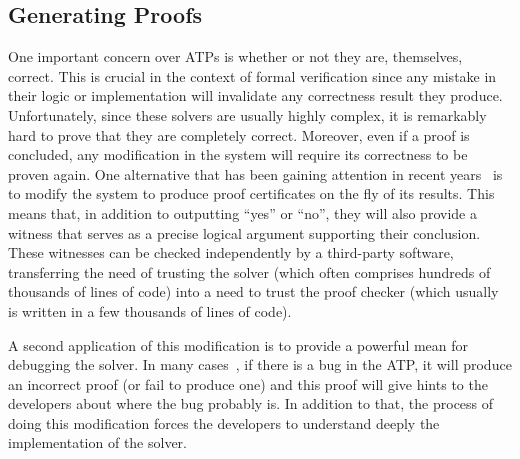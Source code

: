 \documentclass[a4paper, 12pt]{article}
\begin{document}
\subsection{Generating Proofs}
One important concern over ATPs is whether or not they are, themselves, correct. This is crucial
in the context of formal verification since any mistake in their logic or implementation will invalidate any
correctness result they produce. Unfortunately, since these solvers are usually highly complex,
it is remarkably hard to prove that they are completely correct. Moreover, even if a proof is concluded,
any modification in the system will require its correctness to be proven again. One alternative that has been
gaining attention in recent years~\cite{generatingProofs, proofsInSmt} is to modify the system to produce
proof certificates on the fly of its results. This means that, in addition to outputting ``yes'' or ``no'', they will
also provide a witness that serves as a precise logical argument supporting their conclusion. These witnesses can be
checked independently by a third-party software, transferring the need of trusting the solver (which often
comprises hundreds of thousands of lines of code) into a need to trust the proof checker (which usually is
written in a few thousands of lines of code).

A second application of this modification is to provide a powerful mean for debugging the solver.
In many cases~\cite{generatingProofs}, if there is a bug in the ATP, it will produce an incorrect
proof (or fail to produce one) and this proof will give hints to the developers about where the
bug probably is. In addition to that, the process of doing this modification forces
the developers to understand deeply the implementation of the solver.
\end{document}
